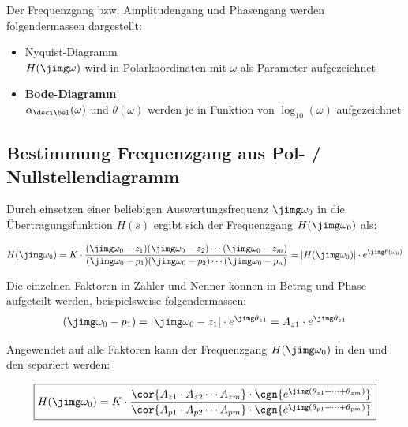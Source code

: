 Der Frequenzgang bzw. Amplitudengang und Phasengang werden folgendermassen dargestellt:

\begin{itemize}
    \item Nyquist-Diagramm \\
        $H(\jimg \omega)$ wird in Polarkoordinaten mit $\omega$ als Parameter aufgezeichnet 
    \item \textbf{Bode-Diagramm} \\
        $\alpha_{\deci \bel}(\omega)$ und $\theta(\omega)$ werden je in Funktion von $\log_{10}(\omega)$ aufgezeichnet
\end{itemize}


\subsection{Bestimmung Frequenzgang aus Pol- / Nullstellendiagramm}

Durch einsetzen einer beliebigen Auswertungsfrequenz $\jimg \omega_0$ in die Übertragungsfunktion $H(s)$ ergibt sich der
Frequenzgang $H(\jimg \omega_0)$ als:

$$ H(\jimg \omega_0) = K \cdot \frac{(\jimg \omega_0 - z_1) (\jimg \omega_0 - z_2) \cdots (\jimg \omega_0 - z_m)}
                                {(\jimg \omega_0 - p_1) (\jimg \omega_0 - p_2) \cdots (\jimg \omega_0 - p_n)}
                                = | H(\jimg \omega_0) | \cdot e^{\jimg \theta (\omega_0)} $$

Die einzelnen Faktoren in Zähler und Nenner können in Betrag und Phase aufgeteilt werden, beispielsweise folgendermassen:
$$ (\jimg \omega_0 - p_1) = |\jimg \omega_0 - z_1| \cdot e^{\jimg \theta_{z1}} = A_{z1} \cdot e^{\jimg \theta_{z1}} $$



Angewendet auf alle Faktoren kann der Frequenzgang $H(\jimg \omega_0)$ in den  und den
 separiert werden:

$$ \boxed{ H(\jimg \omega_0) = K \cdot \frac{\cor{A_{z1} \cdot A_{z2} \cdots A_{zm}} \cdot \cgn{e^{\jimg(\theta_{z1} + \cdots + \theta_{zm})}}}
                                        {\cor{A_{p1} \cdot A_{p2} \cdots A_{pm}} \cdot \cgn{e^{\jimg(\theta_{p1} + \cdots + \theta_{pm})}}} } $$

